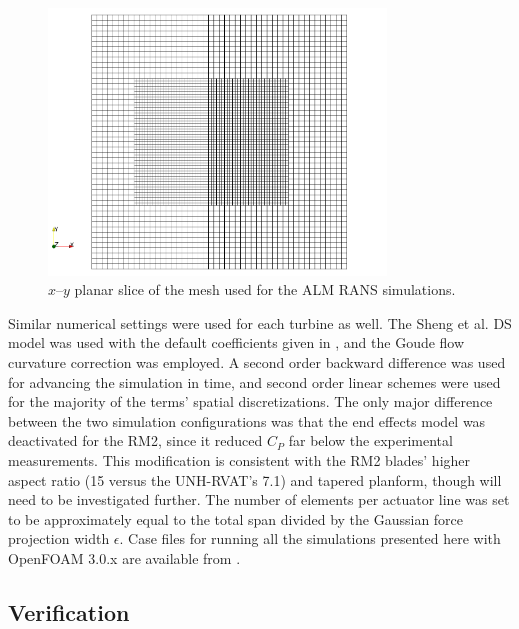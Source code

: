 \documentclass[times]{weauth}
\begin{document}
\begin{figure}
    \centering

    \includegraphics[width=0.8\textwidth]{thesis_alm-mesh}

    \caption{$x$--$y$ planar slice of the mesh used for the ALM RANS
        simulations.}

    \label{fig:ALM-mesh}
\end{figure}

Similar numerical settings were used for each turbine as well. The Sheng et al.
DS model was used with the default coefficients given in \cite{Sheng2008}, and
the Goude flow curvature correction was employed. A second order backward
difference was used for advancing the simulation in time, and second order
linear schemes were used for the majority of the terms' spatial discretizations.
The only major difference between the two simulation configurations was that the
end effects model was deactivated for the RM2, since it reduced $C_P$ far below
the experimental measurements. This modification is consistent with the RM2
blades' higher aspect ratio (15 versus the UNH-RVAT's 7.1) and tapered planform,
though will need to be investigated further. The number of elements per actuator
line was set to be approximately equal to the total span divided by the Gaussian
force projection width $\epsilon$. Case files for running all the simulations
presented here with OpenFOAM 3.0.x are available from
\cite{Bachant2016-UNH-RVAT-turbinesFoam-v1.0.0,
Bachant2016-RM2-turbinesFoam-v1.0.0,
Bachant2016-UNH-RVAT-turbinesFoam-v1.0.0-LES}.


\subsection{Verification}
\end{document}

